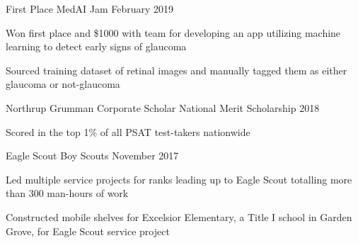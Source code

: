 
\begin{cventries}
  \cventry
    {First Place} %
    {MedAI Jam} %
    {} %
    {February 2019} %
    {
      \begin{cvitems}
        \item {Won first place and \$1000 with team for developing an app utilizing machine learning to detect early signs of glaucoma}
        \item {Sourced training dataset of retinal images and manually tagged them as either glaucoma or not-glaucoma}
      \end{cvitems}
    } %

  \cventry
    {Northrup Grumman Corporate Scholar}
    {National Merit Scholarship}
    {}
    {2018}
    {
      \begin{cvitems}
        \item {Scored in the top 1\% of all PSAT test-takers nationwide}
      \end{cvitems}
    }  
    
  \cventry
    {Eagle Scout}
    {Boy Scouts}
    {}
    {November 2017}
    {
      \begin{cvitems}
        \item {Led multiple service projects for ranks leading up to Eagle Scout totalling more than 300 man-hours of work}
        \item {Constructed mobile shelves for Excelsior Elementary, a Title I school in Garden Grove, for Eagle Scout service project}
      \end{cvitems}
    }

\end{cventries}